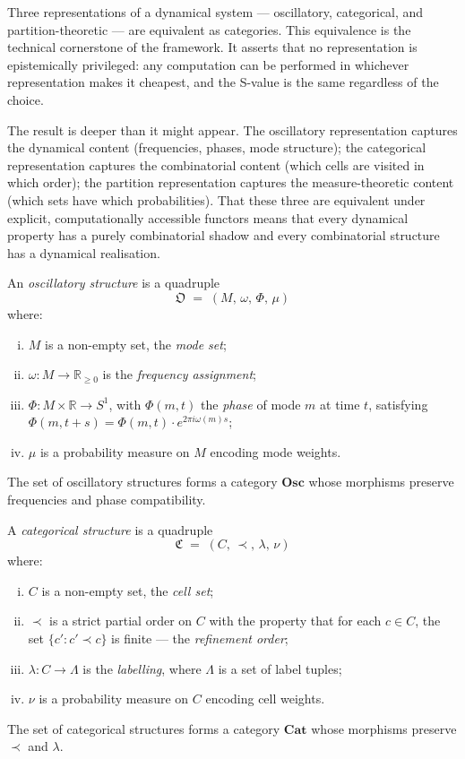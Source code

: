 Three representations of a dynamical system — oscillatory, categorical, and
partition-theoretic — are equivalent as categories.  This equivalence is the
technical cornerstone of the framework.  It asserts that no representation is
epistemically privileged: any computation can be performed in whichever
representation makes it cheapest, and the S-value is the same regardless of
the choice.

The result is deeper than it might appear.  The oscillatory representation
captures the dynamical content (frequencies, phases, mode structure); the
categorical representation captures the combinatorial content (which cells
are visited in which order); the partition representation captures the
measure-theoretic content (which sets have which probabilities).  That these
three are equivalent under explicit, computationally accessible functors means
that every dynamical property has a purely combinatorial shadow and every
combinatorial structure has a dynamical realisation.

\begin{definition}
\label{def:osc-structure}
An \emph{oscillatory structure} is a quadruple
\[
  \mathfrak{O} \;=\; (M,\, \omega,\, \Phi,\, \mu)
\]
where:
\begin{enumerate}[(i)]
  \item $M$ is a non-empty set, the \emph{mode set};
  \item $\omega : M \to \mathbb{R}_{\geq 0}$ is the \emph{frequency assignment};
  \item $\Phi : M \times \mathbb{R} \to S^1$, with $\Phi(m, t)$ the
    \emph{phase} of mode $m$ at time $t$, satisfying
    $\Phi(m, t+s) = \Phi(m, t) \cdot e^{2\pi i \omega(m) s}$;
  \item $\mu$ is a probability measure on $M$ encoding mode weights.
\end{enumerate}
The set of oscillatory structures forms a category $\mathbf{Osc}$ whose
morphisms preserve frequencies and phase compatibility.
\end{definition}

\begin{definition}
\label{def:cat-structure}
A \emph{categorical structure} is a quadruple
\[
  \mathfrak{C} \;=\; (C,\, \prec,\, \lambda,\, \nu)
\]
where:
\begin{enumerate}[(i)]
  \item $C$ is a non-empty set, the \emph{cell set};
  \item $\prec$ is a strict partial order on $C$ with the property that
    for each $c \in C$, the set $\{c' : c' \prec c\}$ is finite —
    the \emph{refinement order};
  \item $\lambda : C \to \Lambda$ is the \emph{labelling}, where $\Lambda$
    is a set of label tuples;
  \item $\nu$ is a probability measure on $C$ encoding cell weights.
\end{enumerate}
The set of categorical structures forms a category $\mathbf{Cat}$ whose
morphisms preserve $\prec$ and $\lambda$.
\end{definition}

